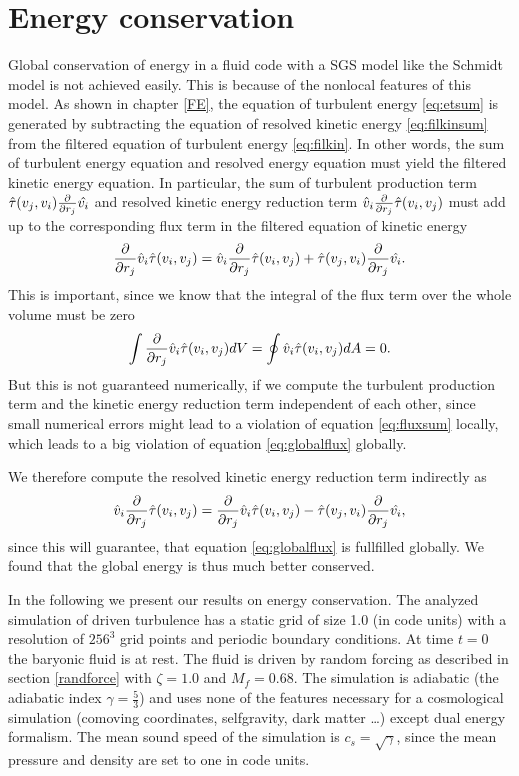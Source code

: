 \section{Energy conservation}\label{numenergy}
Global conservation of energy in a fluid code with a SGS model like the
Schmidt model is not achieved easily. This is because of the nonlocal features
of this model. As shown in chapter \ref{FE}, the equation of turbulent energy
\eqref{eq:etsum} is generated by subtracting the equation of resolved kinetic
energy \eqref{eq:filkinsum} from the filtered equation of turbulent energy
\ref{eq:filkin}. In other words, the sum of turbulent energy equation and
resolved energy equation must yield the filtered kinetic energy equation.
In particular, the sum of turbulent production term
$\hat{\tau}(v_j,v_i)\frac{\partial}{\partial r_j}\hat{v_i}$ and resolved kinetic energy reduction
term $\hat{v}_i\frac{\partial}{\partial r_j}\hat{\tau}(v_i,v_j)$ must add
up to the corresponding flux term in the filtered equation of kinetic energy
\begin{align}
\frac{\partial}{\partial r_j}\hat{v}_i\hat{\tau}(v_i,v_j) =
\hat{v}_i\frac{\partial}{\partial r_j}\hat{\tau}(v_i,v_j)+\hat{\tau}(v_j,v_i)\frac{\partial}{\partial r_j}\hat{v_i}.
\label{eq:fluxsum}
\end{align}
This is important, since we know that the integral of the flux term over the
whole volume must be zero
\begin{align}
\int \frac{\partial}{\partial r_j}\hat{v}_i\hat{\tau}(v_i,v_j) dV = 
\oint\hat{v}_i\hat{\tau}(v_i,v_j) dA = 0. \label{eq:globalflux}
\end{align}
But this is not guaranteed numerically, if we compute the turbulent production
term and the kinetic energy reduction term independent of each other, since
small numerical errors might lead to a violation of equation \eqref{eq:fluxsum}
locally, which leads to a big violation of equation \eqref{eq:globalflux}
globally.

We therefore compute the resolved kinetic energy reduction term indirectly as
\begin{align}
\hat{v}_i\frac{\partial}{\partial r_j}\hat{\tau}(v_i,v_j) = 
\frac{\partial}{\partial r_j}\hat{v}_i\hat{\tau}(v_i,v_j) - 
\hat{\tau}(v_j,v_i)\frac{\partial}{\partial r_j}\hat{v_i},
\end{align}
since this will guarantee, that equation \eqref{eq:globalflux} is fullfilled
globally. We found that the global energy is thus much better conserved. 

In the following we present our results on energy conservation. The analyzed
simulation of driven turbulence has a static grid of size 1.0 (in code units)
with a resolution of $256^3$ grid points and periodic boundary conditions. At
time $t=0$ the baryonic fluid is at rest. The fluid is driven by random forcing
as described in section \ref{randforce} with $\zeta = 1.0$ and $M_f = 0.68$. The
simulation is adiabatic (the adiabatic index $\gamma=\frac{5}{3}$) and uses none
of the features
necessary for a cosmological simulation (comoving coordinates, selfgravity, dark
matter \ldots) except dual energy formalism. The mean sound speed of the
simulation is $c_s=\sqrt{\gamma}$, since the mean pressure and density are set
to one in code units. 

